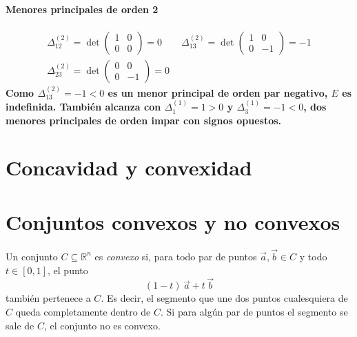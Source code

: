\documentclass{article}
\newcommand{\R}{\ensuremath{\mathbb{R}}}
\newcommand{\vect}[1]{\vec{#1}}
\begin{document}
\paragraph*{Menores principales de orden 2}
\[
\begin{gathered}
\Delta^{(2)}_{12}=\det\begin{pmatrix}1&0\\0&0\end{pmatrix}=0\qquad
\Delta^{(2)}_{13}=\det\begin{pmatrix}1&0\\0&-1\end{pmatrix}=-1\\
\Delta^{(2)}_{23}=\det\begin{pmatrix}0&0\\0&-1\end{pmatrix}=0
\end{gathered}
\]
\textbf{\color{teal}Como \(\Delta^{(2)}_{13}=-1<0\) es un menor principal de orden par negativo, \(E\) es indefinida. También alcanza con \(\Delta^{(1)}_1=1>0\) y \(\Delta^{(1)}_3=-1<0\), dos menores principales de orden impar con signos opuestos.}

\newpage

\section{Concavidad y convexidad}\label{cap:concavidad}

\section*{Conjuntos convexos y no convexos}

Un conjunto \(C\subseteq\R^n\) es \emph{convexo} si, para todo par de puntos \(\vect{a},\vect{b}\in C\) y todo \(t\in[0,1]\), el punto
\[
(1-t)\,\vect{a}+t\,\vect{b}
\]
también pertenece a \(C\). Es decir, el segmento que une dos puntos cualesquiera de \(C\) queda completamente dentro de \(C\). Si para algún par de puntos el segmento se sale de \(C\), el conjunto no es convexo.
\end{document}
